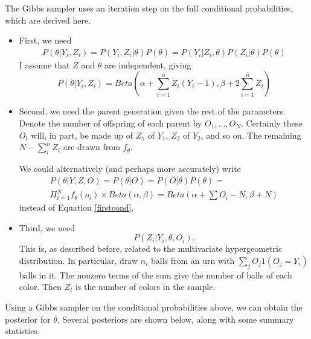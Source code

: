 \documentclass[11 pt]{article}
\renewcommand{\th}{\theta}
\newcommand{\fth}{f_{\th}}
\begin{document}
The Gibbs sampler uses an iteration step on the full conditional probabilities, which are derived here.

\begin{itemize}
  \item First, we need
\begin{align*}
P(\th | Y_i, Z_i) = P(Y_i, Z_i | \th) P(\th) = P(Y_i | Z_i, \th) P(Z_i | \th) P(\th)
\end{align*}
I assume that $Z$ and $\th$ are independent, giving
\begin{equation} \label{firstcond}
P(\th | Y_i, Z_i) = Beta(\alpha + \sum_{i = 1}^{\bar{n}} Z_i(Y_i - 1), \beta + 2 \sum_{i = 1}^{\bar{n}} Z_i)
\end{equation}

 \item Second, we need the parent generation given the rest of the parameters. Denote the number of offspring of each parent by $O_1,...,O_N$. Certainly these $O_i$ will, in part, be made up of $Z_1$ of $Y_1$, $Z_2$ of $Y_2$, and so on. The remaining $N - \sum_i^{\bar{n}}Z_i$ are drawn from $\fth$.

We could alternatively (and perhaps more accurately) write
\begin{align*}
P(\th | Y, Z, O) = P(\th | O) = P(O | \th) P(\th) = \\\Pi_{i = 1}^N \fth(o_i) \times Beta(\alpha,\beta) = Beta(\alpha + \sum O_i - N, \beta + N)
\end{align*}
instead of Equation \eqref{firstcond}.

 \item Third, we need
\[
P(Z_i | Y_i, \th, O_i).
\]
This is, as described before, related to the multivariate hypergeometric distribution. In particular, draw $n_i$ balls from an urn with $\sum_j O_j 1(O_j = Y_i)$ balls in it. The nonzero terms of the sum give the number of balls of each color. Then $Z_i$ is the number of colors in the sample. 
\end{itemize}

Using a Gibbs sampler on the conditional probabilities above, we can obtain the posterior for $\th$. Several posteriors are shown below, along with some summary statistics. 
\end{document}
